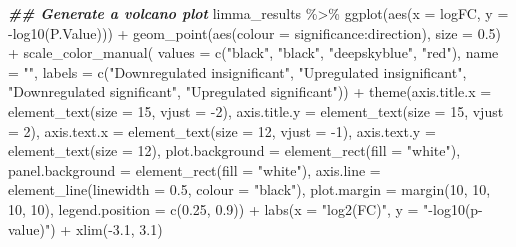 \documentclass[9pt,a4paper,]{extarticle}
\newenvironment{Shaded}{\begin{snugshade}}{\end{snugshade}}
\newcommand{\AttributeTok}[1]{\textcolor[rgb]{0.77,0.63,0.00}{#1}}
\newcommand{\DecValTok}[1]{\textcolor[rgb]{0.00,0.00,0.81}{#1}}
\newcommand{\DocumentationTok}[1]{\textcolor[rgb]{0.56,0.35,0.01}{\textbf{\textit{#1}}}}
\newcommand{\FloatTok}[1]{\textcolor[rgb]{0.00,0.00,0.81}{#1}}
\newcommand{\FunctionTok}[1]{\textcolor[rgb]{0.00,0.00,0.00}{#1}}
\newcommand{\NormalTok}[1]{#1}
\newcommand{\SpecialCharTok}[1]{\textcolor[rgb]{0.00,0.00,0.00}{#1}}
\newcommand{\StringTok}[1]{\textcolor[rgb]{0.31,0.60,0.02}{#1}}
\begin{document}
\begin{Shaded}
\begin{Highlighting}[]
\DocumentationTok{\#\# Generate a volcano plot}
\NormalTok{limma\_results }\SpecialCharTok{\%\textgreater{}\%}
  \FunctionTok{ggplot}\NormalTok{(}\FunctionTok{aes}\NormalTok{(}\AttributeTok{x =}\NormalTok{ logFC, }\AttributeTok{y =} \SpecialCharTok{{-}}\FunctionTok{log10}\NormalTok{(P.Value))) }\SpecialCharTok{+}
  \FunctionTok{geom\_point}\NormalTok{(}\FunctionTok{aes}\NormalTok{(}\AttributeTok{colour =}\NormalTok{ significance}\SpecialCharTok{:}\NormalTok{direction), }\AttributeTok{size =} \FloatTok{0.5}\NormalTok{) }\SpecialCharTok{+}
  \FunctionTok{scale\_color\_manual}\NormalTok{(}
    \AttributeTok{values =} \FunctionTok{c}\NormalTok{(}\StringTok{"black"}\NormalTok{, }\StringTok{"black"}\NormalTok{, }\StringTok{"deepskyblue"}\NormalTok{, }\StringTok{"red"}\NormalTok{), }\AttributeTok{name =} \StringTok{""}\NormalTok{,}
    \AttributeTok{labels =} \FunctionTok{c}\NormalTok{(}\StringTok{"Downregulated insignificant"}\NormalTok{,}
               \StringTok{"Upregulated insignificant"}\NormalTok{,}
               \StringTok{"Downregulated significant"}\NormalTok{,}
               \StringTok{"Upregulated significant"}\NormalTok{)) }\SpecialCharTok{+}
  \FunctionTok{theme}\NormalTok{(}\AttributeTok{axis.title.x =} \FunctionTok{element\_text}\NormalTok{(}\AttributeTok{size =} \DecValTok{15}\NormalTok{, }\AttributeTok{vjust =} \SpecialCharTok{{-}}\DecValTok{2}\NormalTok{),}
        \AttributeTok{axis.title.y =} \FunctionTok{element\_text}\NormalTok{(}\AttributeTok{size =} \DecValTok{15}\NormalTok{, }\AttributeTok{vjust =} \DecValTok{2}\NormalTok{),}
        \AttributeTok{axis.text.x =} \FunctionTok{element\_text}\NormalTok{(}\AttributeTok{size =} \DecValTok{12}\NormalTok{, }\AttributeTok{vjust =} \SpecialCharTok{{-}}\DecValTok{1}\NormalTok{),}
        \AttributeTok{axis.text.y =} \FunctionTok{element\_text}\NormalTok{(}\AttributeTok{size =} \DecValTok{12}\NormalTok{),}
        \AttributeTok{plot.background =} \FunctionTok{element\_rect}\NormalTok{(}\AttributeTok{fill =} \StringTok{"white"}\NormalTok{),}
        \AttributeTok{panel.background =} \FunctionTok{element\_rect}\NormalTok{(}\AttributeTok{fill =} \StringTok{"white"}\NormalTok{),}
        \AttributeTok{axis.line =} \FunctionTok{element\_line}\NormalTok{(}\AttributeTok{linewidth =} \FloatTok{0.5}\NormalTok{, }\AttributeTok{colour =} \StringTok{"black"}\NormalTok{),}
        \AttributeTok{plot.margin =} \FunctionTok{margin}\NormalTok{(}\DecValTok{10}\NormalTok{, }\DecValTok{10}\NormalTok{, }\DecValTok{10}\NormalTok{, }\DecValTok{10}\NormalTok{),}
        \AttributeTok{legend.position =} \FunctionTok{c}\NormalTok{(}\FloatTok{0.25}\NormalTok{, }\FloatTok{0.9}\NormalTok{)) }\SpecialCharTok{+}
  \FunctionTok{labs}\NormalTok{(}\AttributeTok{x =} \StringTok{"log2(FC)"}\NormalTok{, }\AttributeTok{y =} \StringTok{"{-}log10(p{-}value)"}\NormalTok{) }\SpecialCharTok{+}
  \FunctionTok{xlim}\NormalTok{(}\SpecialCharTok{{-}}\FloatTok{3.1}\NormalTok{, }\FloatTok{3.1}\NormalTok{)}
\end{Highlighting}
\end{Shaded}
\end{document}
